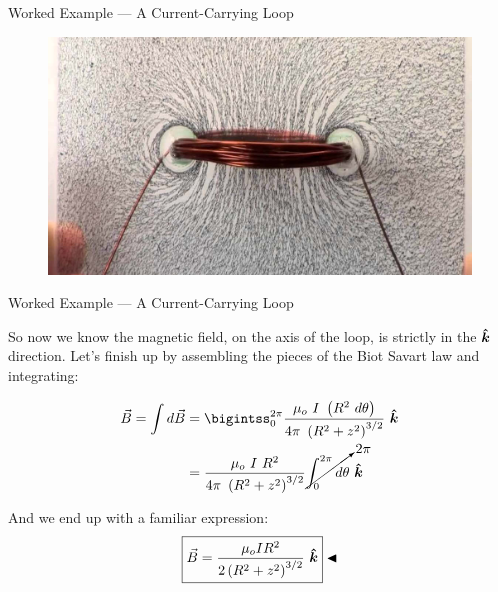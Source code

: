 \documentclass{beamer}
\begin{document}
\begin{frame}{Worked Example --- A Current-Carrying Loop}

\begin{figure}[H]
\centering
\includegraphics[height=0.6\textheight]{figures/copper_loop.jpeg}
\end{figure}

\end{frame}

\begin{frame}{Worked Example --- A Current-Carrying Loop}

So now we know the magnetic field, on the axis of the loop, is strictly in the $\bm{\hat{k}}$ direction. Let's finish up by assembling the pieces of the Biot Savart law and integrating:

\begin{align*}
    \vec{B} = \int d\vec{B} &= \bigintss_{0}^{2\pi} \frac{\mu_o\ I\ \left( R^2\ d\theta \right)}{4\pi\ \left(R^2 + z^2\right)^{3/2}}\ \khat \\
                            &= \frac{\mu_o\ I\ R^2}{4\pi\ \left(R^2 + z^2 \right)^{3/2}} \cancelto{2\pi}{\int_{0}^{2\pi} d\theta}\ \khat
\end{align*}

And we end up with a familiar expression:
\begin{equation*}
    \boxed{\vec{B} = \frac{\mu_o I R^2}{2\left( R^2 + z^2 \right)^{3/2}}\ \bm{\hat{k}}} \blacktriangleleft
\end{equation*}

\end{frame}
\end{document}
